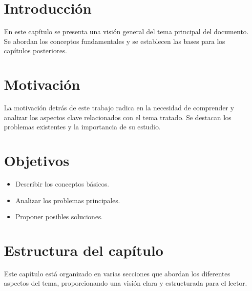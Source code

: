 \section{Introducción}

En este capítulo se presenta una visión general del tema principal del documento. Se abordan los conceptos fundamentales y se establecen las bases para los capítulos posteriores.

\section{Motivación}

La motivación detrás de este trabajo radica en la necesidad de comprender y analizar los aspectos clave relacionados con el tema tratado. Se destacan los problemas existentes y la importancia de su estudio.

\section{Objetivos}

\begin{itemize}
    \item Describir los conceptos básicos.
    \item Analizar los problemas principales.
    \item Proponer posibles soluciones.
\end{itemize}

\section{Estructura del capítulo}

Este capítulo está organizado en varias secciones que abordan los diferentes aspectos del tema, proporcionando una visión clara y estructurada para el lector.